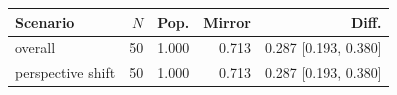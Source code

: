 \begin{tabular}{lrrrr}
\toprule
Scenario & $N$ & Pop. & Mirror & Diff. \\
\midrule
overall & 50 & 1.000 & 0.713 & 0.287 [0.193, 0.380] \\
perspective shift & 50 & 1.000 & 0.713 & 0.287 [0.193, 0.380] \\
\bottomrule
\end{tabular}
